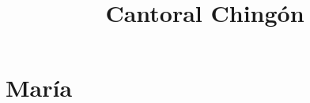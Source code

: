 \documentclass[11pt,oneside,letterpaper]{book}
\begin{document}
\setlength\columnsep{10mm}
\renewcommand{\tabcolsep}{0pt}
\newcommand{\Major}{$\Delta$}
\let\oldsharp\sharp
\renewcommand{\textsharp}{$\oldsharp$}
\newcommand{\sh}{$\oldsharp$}
\newcommand{\tit}[2]{\vspace{5pt}\noindent\begin{tcolorbox}[leftrule=3mm,top=0.5mm,bottom=0.5mm,left=1mm,colback=#2!20,colframe=#2!75!black]{\large\textbf{#1}}\end{tcolorbox}}
\newcommand{\chorus}[1]{\vspace{5pt}\noindent\begin{tcolorbox}[leftrule=3mm,rightrule=3mm,top=2mm,bottom=2mm,left=1mm,colback=chorus!20,colframe=chorus!75!black]{\large\textbf{Coro#1}}\end{tcolorbox}}

\title{\Huge\textbf{Cantoral Chingón}}



\date{}

\maketitle

\titlespacing*{\chapter}{0pt}{0pt}{10pt}


\chapter{María}


\end{document}
